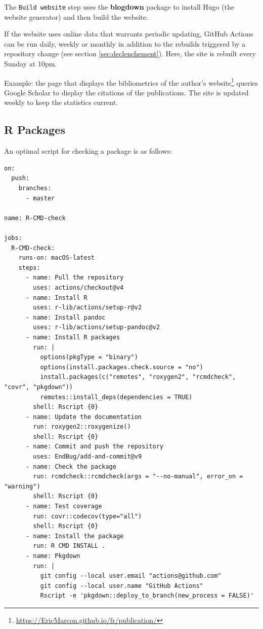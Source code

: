 \documentclass[
  12pt,
  american,
  a4paper,
  extrafontsizes,onecolumn,openright
  ]{memoir}
\begin{document}
The \texttt{Build\ website} step uses the \textbf{blogdown} package to install Hugo (the website generator) and then build the website.

If the website uses online data that warrants periodic updating, GitHub Actions can be run daily, weekly or monthly in addition to the rebuilds triggered by a repository change (see section \ref{sec:declenchement}).
Here, the site is rebuilt every Sunday at 10pm.

Example: the page that displays the bibliometrics of the author's website\footnote{\url{https://EricMarcon.github.io/fr/publication/}} queries Google Scholar to display the citations of the publications.
The site is updated weekly to keep the statistics current.

\hypertarget{sec:package-ci6}{%
\subsection{R Packages}\label{sec:package-ci6}}

An optimal script for checking a package is as follows:

\begin{verbatim}
on:
  push:
    branches:
      - master

name: R-CMD-check

jobs:
  R-CMD-check:
    runs-on: macOS-latest
    steps:
      - name: Pull the repository
        uses: actions/checkout@v4
      - name: Install R
        uses: r-lib/actions/setup-r@v2
      - name: Install pandoc
        uses: r-lib/actions/setup-pandoc@v2
      - name: Install R packages
        run: |
          options(pkgType = "binary")
          options(install.packages.check.source = "no")
          install.packages(c("remotes", "roxygen2", "rcmdcheck", "covr", "pkgdown"))
          remotes::install_deps(dependencies = TRUE)
        shell: Rscript {0}
      - name: Update the documentation
        run: roxygen2::roxygenize()
        shell: Rscript {0}
      - name: Commit and push the repository
        uses: EndBug/add-and-commit@v9
      - name: Check the package
        run: rcmdcheck::rcmdcheck(args = "--no-manual", error_on = "warning")
        shell: Rscript {0}
      - name: Test coverage
        run: covr::codecov(type="all")
        shell: Rscript {0}
      - name: Install the package
        run: R CMD INSTALL .
      - name: Pkgdown
        run: |
          git config --local user.email "actions@github.com"
          git config --local user.name "GitHub Actions"
          Rscript -e 'pkgdown::deploy_to_branch(new_process = FALSE)'
\end{verbatim}
\end{document}
